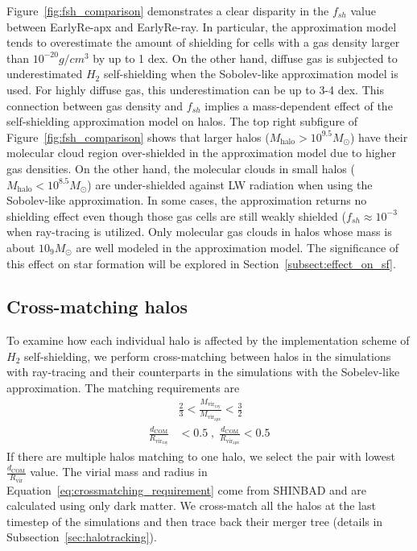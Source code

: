 \documentclass[linenumbers, twocolumn]{aastex631}
\begin{document}
Figure~\ref{fig:fsh_comparison} demonstrates a clear disparity in the $f_{sh}$ value between EarlyRe-apx and EarlyRe-ray. In particular, the approximation model tends to overestimate the amount of shielding for cells with a gas density larger than $10^{-20} g/cm^3$ by up to 1 dex. On the other hand, diffuse gas is subjected to underestimated $H_{2}$ self-shielding when the Sobolev-like approximation model is used. For highly diffuse gas, this underestimation can be up to 3-4 dex. This connection between gas density and $f_{sh}$ implies a mass-dependent effect of the self-shielding approximation model on halos. The top right subfigure of Figure~\ref{fig:fsh_comparison} shows that larger halos ($M_{\text{halo}} > 10^{9.5} M_{\odot}$) have their molecular cloud region over-shielded in the approximation model due to higher gas densities. On the other hand, the molecular clouds in small halos ($M_{\text{halo}} < 10^{8.5} M_{\odot}$) are under-shielded against LW radiation when using the Sobolev-like approximation. In some cases, the approximation returns no shielding effect even though those gas cells are still weakly shielded ($f_{sh} \approx 10^{-3}$ when ray-tracing is utilized. Only molecular gas clouds in halos whose mass is about $10_{9} M_\odot$ are well modeled in the approximation model. The significance of this effect on star formation will be explored in Section~\ref{subsect:effect_on_sf}.


\subsection{Cross-matching halos}
\label{subsect:cross-matching_halos}
To examine how each individual halo is affected by the implementation scheme of $H_{2}$ self-shielding, we perform cross-matching between halos in the simulations with ray-tracing and their counterparts in the simulations with the Sobelev-like approximation. The matching requirements are
\begin{align}
    & \frac{2}{3} < \frac{M_{\mathrm{vir}_{\mathrm{ray}}}}{M_{\mathrm{vir}_{\mathrm{apx}}}} < \frac{3}{2} \nonumber \\
    \frac{d_{\text{COM}}}{R_{\mathrm{vir}_{\mathrm{ray}}}} & < 0.5 \; , \; \frac{d_{\text{COM}}}{R_{\mathrm{vir}_{\mathrm{apx}}}} < 0.5 
\label{eq:crossmatching_requirement}
\end{align}
If there are multiple halos matching to one halo, we select the pair with lowest $\frac{d_{\text{COM}}}{R_{\mathrm{vir}}}$ value. The virial mass and radius in Equation~\ref{eq:crossmatching_requirement} come from SHINBAD and are calculated using only dark matter. We cross-match all the halos at the last timestep of the simulations and then trace back their merger tree (details in Subsection~\ref{sec:halotracking}).
\end{document}

